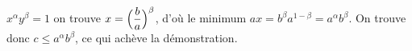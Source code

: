 \documentclass[11pt,a4paper]{article}
\begin{document}
 $x^\alpha y^\beta = 1$ on trouve $x = \Bigl(\dfrac ba\Bigr)^\beta$, d'où \struck{\ill{}} le minimum  $ax = b^\beta a^{1-\beta} = a^\alpha b^\beta$.  On trouve donc $c \leq a^\alpha b^\beta$, ce qui achève la démonstration.
\end{document}
